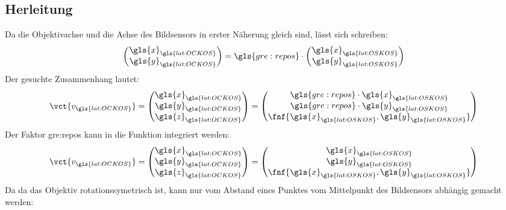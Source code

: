 \subsection{Herleitung}
Da die Objektivachse und die Achse des Bildsensors in erster Näherung gleich sind, lässt sich schreiben:
\begin{equation}
\begin{pmatrix}
\gls{x}_{\gls{lat:OCKOS}} \\ \gls{y}_{\gls{lat:OCKOS}}
\end{pmatrix}
= \gls{gre:repos} \cdot
\begin{pmatrix}
\gls{x}_{\gls{lat:OSKOS}} \\ \gls{y}_{\gls{lat:OSKOS}}
\end{pmatrix}
\end{equation}
Der gesuchte Zusammenhang lautet: 
\begin{equation}
\vct{v_{\gls{lat:OCKOS}}} =
\begin{pmatrix}
\gls{x}_{\gls{lat:OCKOS}} \\ \gls{y}_{\gls{lat:OCKOS}} \\ \gls{z}_{\gls{lat:OCKOS}}
\end{pmatrix}
=
\begin{pmatrix}
\gls{gre:repos} \cdot \gls{x}_{\gls{lat:OSKOS}} \\  \gls{gre:repos} \cdot \gls{y}_{\gls{lat:OSKOS}} \\ \fnf{\gls{x}_{\gls{lat:OSKOS}},\gls{y}_{\gls{lat:OSKOS}}}
\end{pmatrix}
\end{equation}
Der Faktor  \gls{gre:repos} kann in die Funktion  integriert werden:
\begin{equation}
\label{eq:ocamcalibuv}
\vct{v_{\gls{lat:OCKOS}}} =
\begin{pmatrix}
\gls{x}_{\gls{lat:OCKOS}} \\ \gls{y}_{\gls{lat:OCKOS}} \\ \gls{z}_{\gls{lat:OCKOS}}
\end{pmatrix}
=
\begin{pmatrix}
\gls{x}_{\gls{lat:OSKOS}} \\ \gls{y}_{\gls{lat:OSKOS}} \\ \fnf{\gls{x}_{\gls{lat:OSKOS}},\gls{y}_{\gls{lat:OSKOS}}}
\end{pmatrix}
\end{equation}
Da da das Objektiv rotationssymetrisch ist, kann  nur vom Abstand eines Punktes vom Mittelpunkt des Bildsensors abhängig gemacht werden:
